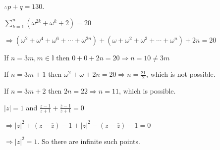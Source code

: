   $\therefore p + q = 130$.
\item $\displaystyle\sum_{k = 1}^n\left(\omega^{2k} + \omega^k + 2\right) = 20$

  $\Rightarrow \left(\omega^2 + \omega^4 + \omega^6 + \cdots + \omega^{2n}\right)  + \left(\omega
  + \omega^2 + \omega^3 + \cdots + \omega^n\right) + 2n = 20$

  If $n = 3m, m\in\mathbb{I}$ then $0 + 0 + 2n = 20 \Rightarrow n = 10\neq 3m$

  If $n = 3m + 1$ then $\omega^2 + \omega + 2n = 20 \Rightarrow n = \frac{21}{2}$, which is not possible.

  If $n = 3m + 2$ then $2n = 22 \Rightarrow n = 11$, which is possible.
\item $|z| = 1$ and $\frac{z - 1}{z + 1} + \frac{\overline{z} - 1}{\overline{z} + 1} = 0$

  $\Rightarrow |z|^2 + \left(z - \overline{z}\right) - 1 + |z|^2 - \left(z - \overline{z}\right) - 1 = 0$

  $\Rightarrow |z|^2 = 1$. So there are infinite such points.
\stopitemize
